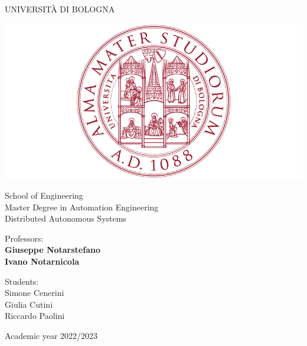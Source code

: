\documentclass[a4paper,11pt,oneside]{book}
\begin{document}
\pagestyle{myheadings}

\thispagestyle{empty}                                                 
\begin{center}                                                            
    \vspace{5mm}
    {\LARGE UNIVERSIT\`A DI BOLOGNA} \\                       
      \vspace{5mm}
\end{center}
\begin{center}
  \includegraphics[scale=.27]{logo_unibo}
\end{center}
\begin{center}
      \vspace{5mm}
      {\LARGE School of Engineering} \\
        \vspace{3mm}
      {\Large Master Degree in Automation Engineering} \\
      \vspace{20mm}
      {\LARGE Distributed Autonomous Systems} \\
      \vspace{15mm}
\end{center}
\begin{flushleft}                                                                              
     {\large Professors:}\\
     \textbf{\@ Giuseppe Notarstefano} \\
     \textbf{\@ Ivano Notarnicola} \\        
     \vspace{13mm}
\end{flushleft}
\begin{flushright}
      {\large Students:}\\
      {Simone Cenerini} \\
      {Giulia Cutini} \\
      {Riccardo Paolini} \\
\end{flushright}        %
\begin{center}
\vfill
      {\large Academic year \@2022/2023} \\
\end{center}
\end{document}
